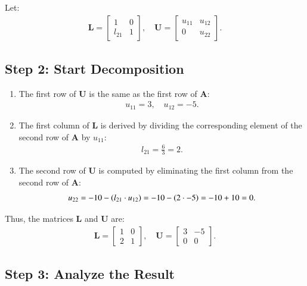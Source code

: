 \documentclass[journal,12pt,onecolumn]{IEEEtran}
\theoremstyle{remark}
\begin{document}
Let:
\begin{align}
\mathbf{L} =
\begin{bmatrix}
1 & 0 \\
l_{21} & 1
\end{bmatrix}, \quad
\mathbf{U} =
\begin{bmatrix}
u_{11} & u_{12} \\
0 & u_{22}
\end{bmatrix}.
\end{align}

\subsection*{Step 2: Start Decomposition}

\begin{enumerate}
    \item The first row of $\mathbf{U}$ is the same as the first row of $\mathbf{A}$:
    \begin{align}
    u_{11} = 3, \quad u_{12} = -5.
    \end{align}
    
    \item The first column of $\mathbf{L}$ is derived by dividing the corresponding element of the second row of $\mathbf{A}$ by $u_{11}$:
    \begin{align}
    l_{21} = \frac{6}{3} = 2.
    \end{align}
    
    \item The second row of $\mathbf{U}$ is computed by eliminating the first column from the second row of $\mathbf{A}$:
    \begin{align}
    u_{22} = -10 - \left(l_{21} \cdot u_{12}\right) = -10 - \left(2 \cdot -5\right) = -10 + 10 = 0.
    \end{align}
\end{enumerate}

Thus, the matrices $\mathbf{L}$ and $\mathbf{U}$ are:
\begin{align}
\mathbf{L} =
\begin{bmatrix}
1 & 0 \\
2 & 1
\end{bmatrix}, \quad
\mathbf{U} =
\begin{bmatrix}
3 & -5 \\
0 & 0
\end{bmatrix}.
\end{align}

\subsection*{Step 3: Analyze the Result}
\end{document}
